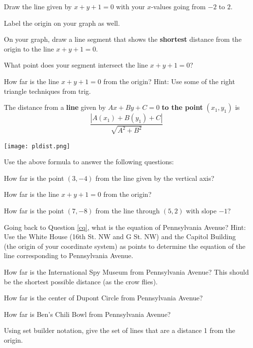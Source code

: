 \bq
\be
\item Draw the line given by $x+y+1=0$ with your $x$-values going from $-2$ to $2$.
\item Label the origin on your graph as well.
\item On your graph, draw a line segment that shows the \textbf{shortest} distance from the origin to the line $x+y+1=0$.
\item What point does your segment intersect the line $x+y+1=0$?
\item How far is the line $x+y+1=0$ from the origin? Hint: Use some of the right triangle techniques from trig.
\ee
\eq

\begin{info}
The distance from a \textbf{line} given by $Ax+By+C=0$ \textbf{to the point} $(x_1,y_1)$ is $$\frac{|A(x_1)+B(y_1)+C|}{\sqrt{A^2+B^2}}$$

\begin{center} \texttt{[image: pldist.png]} \end{center}
\end{info}

\bq Use the above formula to answer the following questions:
\be
\item How far is the point $(3,-4)$ from the line given by the vertical axis?
\item How far is the line $x+y+1=0$ from the origin?
\item How far is the point $(7,-8)$ from the line through $(5,2)$ with slope $-1$?
\ee
\eq

\bq \be
\item Going back to Question \ref{cq}, what is the equation of Pennsylvania Avenue?  Hint: Use the White House (16th St. NW and G St. NW) and the Capitol Building (the origin of your coordinate system) as points to determine the equation of the line corresponding to Pennsylvania Avenue.
\item How far is the International Spy Museum from Pennsylvania Avenue? This should be the shortest possible distance (as the crow flies).
\item How far is the center of Dupont Circle from Pennsylvania Avenue?
\item How far is Ben's Chili Bowl from Pennsylvania Avenue?
\ee
\eq

\bq Using set builder notation, give the set of lines that are a distance 1 from the origin.
\eq

